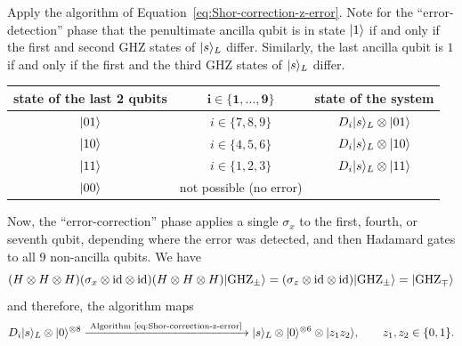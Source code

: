 \documentclass[a4paper, oneside, 12pt]{amsart}
\begin{document}
\begin{remark}
\begin{thmlist}
    \item Apply the algorithm of Equation~\eqref{eq:Shor-correction-z-error}.
    Note for the ``error-detection'' phase that the penultimate ancilla qubit is in state \(\lvert1\rangle\) if and only if the first and second GHZ states of \(\lvert s\rangle_{L}\) differ.
    Similarly, the last ancilla  qubit is \(1\) if and only if the first and the third GHZ states of \(\lvert s\rangle_{L}\) differ.
     \begin{center}
      \begin{tabular}{| c | c | c |}
        \textbf{state of the last 2 qubits} & \(\mathbf{i \in\{ 1, \dots , 9\}}\) & \textbf{state of the system}\\\hline
        \(\lvert01\rangle\) & \(i\in\{7,8,9\}\) & \(D_{i}\lvert s\rangle_{L}\otimes \lvert01\rangle\)\\
        \(\lvert10\rangle\) & \(i\in\{4,5,6\}\) & \(D_{i}\lvert s\rangle_{L}\otimes \lvert10\rangle\) \\
        \(\lvert11\rangle\) & \(i\in\{1,2,3\}\) & \(D_{i}\lvert s\rangle_{L}\otimes \lvert11\rangle\) \\[2\baselineskip]
        \(\lvert00\rangle\) & not possible (no error)  &
      \end{tabular}
    \end{center}
    Now, the ``error-correction'' phase applies a single \(\sigma_{x}\) to the first, fourth, or seventh qubit, depending where the error was detected, and then Hadamard gates to all 9 non-ancilla qubits.
    We have
    \begin{equation*}
      (H \otimes H \otimes H)(\sigma_{x}\otimes \mathrm{id} \otimes \mathrm{id} )(H \otimes H \otimes H) \lvert\mathrm{GHZ}_{\pm}\rangle
      = (\sigma_{z} \otimes \mathrm{id} \otimes \mathrm{id}) \lvert\mathrm{GHZ}_{\pm}\rangle = \lvert\mathrm{GHZ}_{\mp}\rangle
    \end{equation*}
    and therefore, the algorithm maps
    \begin{equation}\label{eq:z-correction-summarised}
      D_{i}\lvert s\rangle_{L} \otimes \lvert0\rangle^{\otimes 8}  \xrightarrow{\; \text{Algorithm~\eqref{eq:Shor-correction-z-error}}\;} \lvert s\rangle_{L} \otimes \lvert0\rangle^{\otimes 6}\otimes \lvert z_{1}z_{2}\rangle, \qquad z_{1},z_{2}\in\{0,1\}.
    \end{equation}
  \end{thmlist}
\end{remark}
\end{document}
